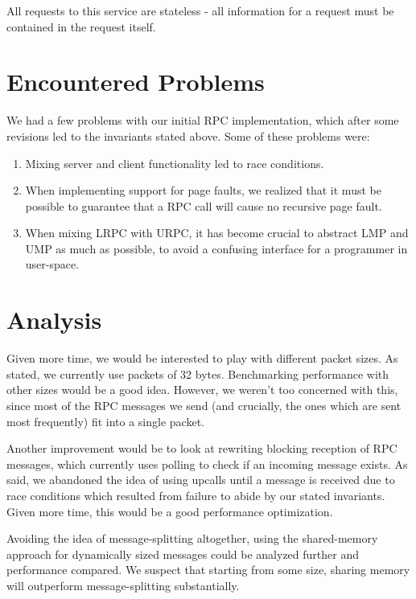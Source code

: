 All requests to this service are stateless - all information for a request must be 
contained in the request itself.


\section{Encountered Problems}
We had a few problems with our initial RPC implementation, 
which after some revisions led to the invariants stated above. Some of these problems were:
\begin{enumerate}
    \item Mixing server and client functionality led to race conditions.

    \item When implementing support for page faults, we realized that it must be possible 
to guarantee that a RPC call will cause no recursive page fault.

    \item When mixing LRPC with URPC, it has become crucial to abstract LMP and UMP as much 
as possible, to avoid a confusing interface for a programmer in user-space.
\end{enumerate}

\section{Analysis} %
Given more time, we would be interested to play with different packet sizes. As stated,
we currently use packets of 32 bytes. Benchmarking performance with other sizes 
would be a good idea. However, we weren't too concerned with this, since most of the RPC
messages we send (and crucially, the ones which are sent most frequently) fit into a single packet.

Another improvement would be to look at rewriting blocking reception of RPC messages,
which currently uses polling to check if an incoming message exists. As said, we 
abandoned the idea of using upcalls until a message is received due to race conditions 
which resulted from failure to abide by our stated invariants. Given more time, 
this would be a good performance optimization.

Avoiding the idea of message-splitting altogether, 
using the shared-memory approach for dynamically sized messages could be 
analyzed further and performance compared. We suspect that starting from some size, 
sharing memory will outperform message-splitting substantially.


